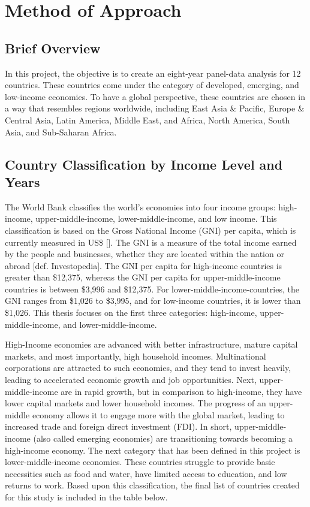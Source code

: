 \chapter{Method of Approach} 
\label{ch:method}



\section{Brief Overview}
\hspace{20pt}In this project, the objective is to create an eight-year panel-data analysis for 12 countries. These countries come under the category of developed, emerging, and low-income economies. To have a global perspective, these countries are chosen in a way that resembles regions worldwide, including East Asia & Pacific, Europe & Central Asia, Latin America, Middle East, and Africa, North America, South Asia, and Sub-Saharan Africa.

\section{Country Classification by Income Level and Years}
\hspace{20pt} The World Bank classifies the world’s economies into four income groups: high-income, upper-middle-income, lower-middle-income, and low income. This classification is based on the Gross National Income (GNI) per capita, which is currently measured in US\$ []. The GNI is a measure of the total income earned by the people and businesses, whether they are located within the nation or abroad [def. Investopedia]. The GNI per capita for high-income countries is greater than \$12,375, whereas the GNI per capita for upper-middle-income countries is between \$3,996 and \$12,375. For lower-middle-income-countries, the GNI ranges from \$1,026 to \$3,995, and for low-income countries, it is lower than \$1,026. This thesis focuses on the first three categories: high-income, upper-middle-income, and lower-middle-income.

High-Income economies are advanced with better infrastructure, mature capital markets, and most importantly, high household incomes. Multinational corporations are attracted to such economies, and they tend to invest heavily, leading to accelerated economic growth and job opportunities. Next, upper-middle-income are in rapid growth, but in comparison to high-income, they have lower capital markets and lower household incomes. The progress of an upper-middle economy allows it to engage more with the global market, leading to increased trade and foreign direct investment (FDI). In short, upper-middle-income (also called emerging economies) are transitioning towards becoming a high-income economy. The next category that has been defined in this project is lower-middle-income economies. These countries struggle to provide basic necessities such as food and water, have limited access to education, and low returns to work. Based upon this classification, the final list of countries created for this study is included in the table below.

